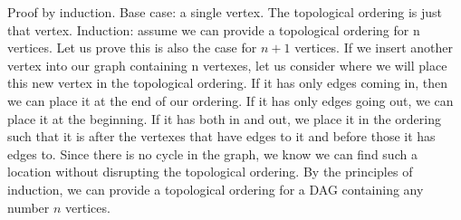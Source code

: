 \documentclass[solution, letterpaper]{cs20inclass}
\begin{document}
\begin{solution}
Proof by induction. Base case: a single vertex. The topological ordering is just that vertex. Induction: assume we can provide a topological ordering for n vertices. Let us prove this is also the case for $n+1$ vertices. If we insert another vertex into our graph containing n vertexes, let us consider where we will place this new vertex in the topological ordering. If it has only edges coming in, then we can place it at the end of our ordering. If it has only edges going out, we can place it at the beginning. If it has both in and out, we place it in the ordering such that it is after the vertexes that have edges to it and before those it has edges to. Since there is no cycle in the graph, we know we can find such a location without disrupting the topological ordering. By the principles of induction, we can provide a topological ordering for a DAG containing any number $n$ vertices. 
\end{solution}
\end{document}
